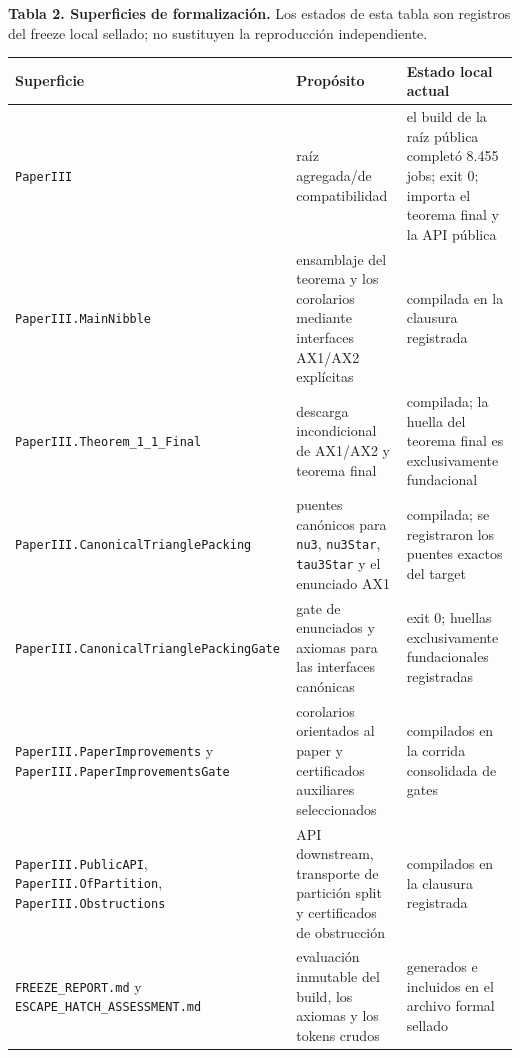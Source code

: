 \documentclass[
  spanish,
  11pt,
  a4paper,
]{article}
\newcounter{none} %
\begin{document}
\textbf{Tabla 2. Superficies de formalización.} Los estados de esta tabla son registros del freeze local sellado; no sustituyen la reproducción independiente.

{\def\LTcaptype{none} %
\begin{longtable}[]{@{}
  >{\raggedright\arraybackslash}p{}
  >{\raggedright\arraybackslash}p{}
  >{\raggedright\arraybackslash}p{}@{}}
\toprule\noalign{}
\begin{minipage}[b]{\linewidth}\raggedright
Superficie
\end{minipage} & \begin{minipage}[b]{\linewidth}\raggedright
Propósito
\end{minipage} & \begin{minipage}[b]{\linewidth}\raggedright
Estado local actual
\end{minipage} \\
\midrule\noalign{}
\endhead
\bottomrule\noalign{}
\endlastfoot
\texttt{PaperIII} & raíz agregada/de compatibilidad & el build de la raíz pública completó 8.455 jobs; exit 0; importa el teorema final y la API pública \\
\texttt{PaperIII.MainNibble} & ensamblaje del teorema y los corolarios mediante interfaces AX1/AX2 explícitas & compilada en la clausura registrada \\
\texttt{PaperIII.Theorem\_1\_1\_Final} & descarga incondicional de AX1/AX2 y teorema final & compilada; la huella del teorema final es exclusivamente fundacional \\
\texttt{PaperIII.CanonicalTrianglePacking} & puentes canónicos para \texttt{nu3}, \texttt{nu3Star}, \texttt{tau3Star} y el enunciado AX1 & compilada; se registraron los puentes exactos del target \\
\texttt{PaperIII.CanonicalTrianglePacking\allowbreak{}Gate} & gate de enunciados y axiomas para las interfaces canónicas & exit 0; huellas exclusivamente fundacionales registradas \\
\texttt{PaperIII.PaperImprovements} y \texttt{PaperIII.PaperImprovementsGate} & corolarios orientados al paper y certificados auxiliares seleccionados & compilados en la corrida consolidada de gates \\
\texttt{PaperIII.PublicAPI}, \texttt{PaperIII.OfPartition}, \texttt{PaperIII.Obstructions} & API downstream, transporte de partición split y certificados de obstrucción & compilados en la clausura registrada \\
\texttt{FREEZE\_REPORT.md} y \texttt{ESCAPE\_HATCH\_ASSESSMENT.md} & evaluación inmutable del build, los axiomas y los tokens crudos & generados e incluidos en el archivo formal sellado \\
\end{longtable}
}
\end{document}
